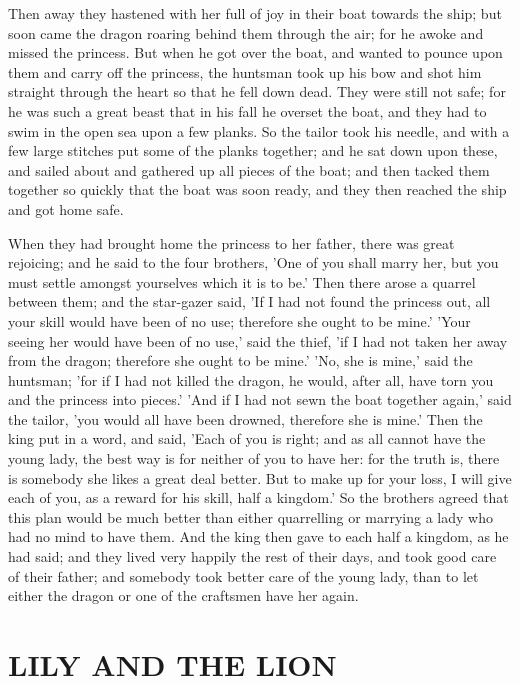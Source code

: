 \documentclass[12pt]{book}
\begin{document}
Then away they hastened with her full of joy in their boat towards the
ship; but soon came the dragon roaring behind them through the air;
for he awoke and missed the princess. But when he got over the boat,
and wanted to pounce upon them and carry off the princess, the
huntsman took up his bow and shot him straight through the heart so
that he fell down dead. They were still not safe; for he was such a
great beast that in his fall he overset the boat, and they had to swim
in the open sea upon a few planks. So the tailor took his needle, and
with a few large stitches put some of the planks together; and he sat
down upon these, and sailed about and gathered up all pieces of the
boat; and then tacked them together so quickly that the boat was soon
ready, and they then reached the ship and got home safe.

When they had brought home the princess to her father, there was great
rejoicing; and he said to the four brothers, 'One of you shall marry
her, but you must settle amongst yourselves which it is to be.' Then
there arose a quarrel between them; and the star-gazer said, 'If I had
not found the princess out, all your skill would have been of no use;
therefore she ought to be mine.' 'Your seeing her would have been of
no use,' said the thief, 'if I had not taken her away from the dragon;
therefore she ought to be mine.' 'No, she is mine,' said the huntsman;
'for if I had not killed the dragon, he would, after all, have torn
you and the princess into pieces.' 'And if I had not sewn the boat
together again,' said the tailor, 'you would all have been drowned,
therefore she is mine.' Then the king put in a word, and said, 'Each
of you is right; and as all cannot have the young lady, the best way
is for neither of you to have her: for the truth is, there is somebody
she likes a great deal better. But to make up for your loss, I will
give each of you, as a reward for his skill, half a kingdom.' So the
brothers agreed that this plan would be much better than either
quarrelling or marrying a lady who had no mind to have them. And the
king then gave to each half a kingdom, as he had said; and they lived
very happily the rest of their days, and took good care of their
father; and somebody took better care of the young lady, than to let
either the dragon or one of the craftsmen have her again.



\chapter{LILY AND THE LION}
\end{document}
